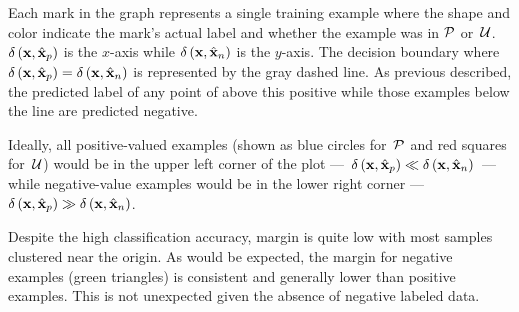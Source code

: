 Each mark in the graph represents a single training example where the shape and color indicate the mark's actual label and whether the example was in $\mathcal{P}$ or~$\mathcal{U}$. $\delta\left(\mathbf{x}, \hat{\mathbf{x}}_{p}\right)$ is the $x$-axis while $\delta\left(\mathbf{x}, \hat{\mathbf{x}}_{n}\right)$ is the $y$-axis. The decision boundary where ${\delta\left(\mathbf{x}, \hat{\mathbf{x}}_{p}\right)=\delta\left(\mathbf{x}, \hat{\mathbf{x}}_{n}\right)}$ is represented by the gray dashed line.  As previous described, the predicted label of any point of above this positive while those examples below the line are predicted negative.

Ideally, all positive-valued examples (shown as blue circles for~$\mathcal{P}$ and red squares for~$\mathcal{U}$) would be in the upper left corner of the plot ---~${\delta\left(\mathbf{x}, \hat{\mathbf{x}}_{p}\right)\ll\delta\left(\mathbf{x}, \hat{\mathbf{x}}_{n}\right)}$~--- while negative-value examples would be in the lower right corner ---~${\delta\left(\mathbf{x}, \hat{\mathbf{x}}_{p}\right)\gg\delta\left(\mathbf{x}, \hat{\mathbf{x}}_{n}\right)}$.

\begin{figure}[t]
  \centering
  \caption{}\label{fig:Experiments:UnlabelPlot}
\end{figure}

Despite the high classification accuracy, margin is quite low with most samples clustered near the origin.  As would be expected, the margin for negative examples (green triangles) is consistent and generally lower than positive examples.  This is not unexpected given the absence of negative labeled data.
